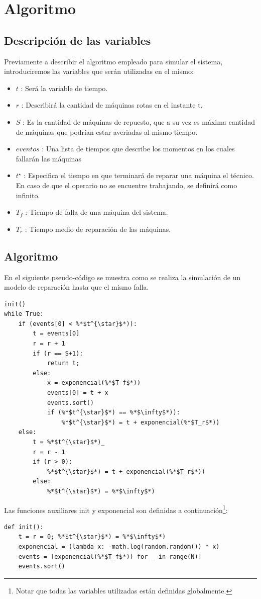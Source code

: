 \documentclass[10pt,a4paper]{article} %
\begin{document}
    \newpage
    \section{Algoritmo}
    \subsection{Descripci\'on de las variables}
    Previamente a describir el algoritmo empleado para simular el sistema, introduciremos las variables que ser\'an utilizadas en el mismo:
    \begin{itemize}
    \item $t$ : Ser\'a la variable de tiempo.
    \item $r$ : Describir\'a la cantidad de m\'aquinas rotas en el instante t.
    \item $S$ : Es la cantidad de m\'aquinas de repuesto, que a su vez es m\'axima cantidad de m\'aquinas que podr\'ian estar averiadas al mismo tiempo.
    \item $eventos$ : Una lista de tiempos que describe los momentos en los cuales fallar\'an las m\'aquinas
    \item $t^{\star}$ : Especifica el tiempo en que terminar\'a de reparar una m\'aquina el t\'ecnico. En caso de que el operario no se encuentre trabajando, se definir\'a como infinito.
    \item $T_f$ : Tiempo de falla de una m\'aquina del sistema.
    \item $T_r$ : Tiempo medio de reparaci\'on de las m\'aquinas.
    \end{itemize}

    \subsection{Algoritmo}
    En el siguiente pseudo-c\'odigo se muestra como se realiza la simulaci\'on de un modelo de reparaci\'on hasta que el mismo falla.
    
    \begin{lstlisting}[caption=Funciones auxiliares.]
init()
while True:
    if (events[0] < %*$t^{\star}$*)):
        t = events[0]
        r = r + 1
        if (r == S+1):
            return t;
        else:
            x = exponencial(%*$T_f$*))
            events[0] = t + x
            events.sort()
            if (%*$t^{\star}$*) == %*$\infty$*)):
                %*$t^{\star}$*) = t + exponencial(%*$T_r$*))
    else: 
        t = %*$t^{\star}$*)_
        r = r - 1
        if (r > 0):
            %*$t^{\star}$*) = t + exponencial(%*$T_r$*))
        else:
            %*$t^{\star}$*) = %*$\infty$*)
    \end{lstlisting}
Las funciones auxiliares init y exponencial son definidas a continuaci\'on\footnote{Notar que todas las variables utilizadas est\'an definidas globalmente.}:
    \begin{lstlisting}[caption=Pseudo-c\'odigo del las funciones auxiliares.]
def init():
    t = r = 0; %*$t^{\star}$*) = %*$\infty$*)
    exponencial = (lambda x: -math.log(random.random()) * x)
    events = [exponencial(%*$T_f$*)) for _ in range(N)]
    events.sort()
    \end{lstlisting}
    
\end{document}
